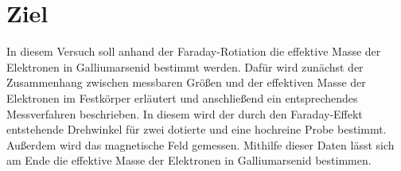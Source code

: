 \section{Ziel}
\label{sec:Ziel}
In diesem Versuch soll anhand der Faraday-Rotiation die effektive Masse der
Elektronen in Galliumarsenid bestimmt werden. Dafür wird zunächst der Zusammenhang
zwischen messbaren Größen und der effektiven Masse der Elektronen im Festkörper
erläutert und anschließend ein entsprechendes Messverfahren beschrieben. In diesem
wird der durch den Faraday-Effekt entstehende Drehwinkel für
zwei dotierte und eine hochreine Probe bestimmt. Außerdem wird das magnetische
Feld gemessen. Mithilfe dieser Daten lässt sich am Ende die effektive Masse
der Elektronen in Galliumarsenid bestimmen.
